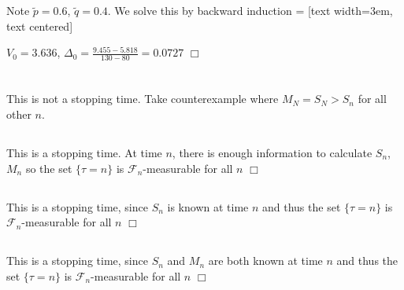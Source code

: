 \documentclass{article}
\begin{document}
\section{}
Note $\tilde{p} = 0.6$, $\tilde{q} = 0.4$. We solve this by backward induction
 = [text width=3em, text centered]
\begin{center}
\end{center}
$V_0 = 3.636$, $\Delta_0 = \frac{9.455 - 5.818}{130 - 80} = 0.0727$ $\Box$

\section{}
\subsection{}
This is not a stopping time. Take counterexample where $M_N = S_N > S_n$ for all other $n$.

\subsection{}
This is a stopping time. At time $n$, there is enough information to calculate $S_n$, $M_n$ so the set $\{\tau = n\}$ is $\mathcal{F}_n$-measurable for all $n$ $\Box$

\subsection{}
This is a stopping time, since $S_n$ is known at time $n$ and thus the set $\{\tau = n\}$ is $\mathcal{F}_n$-measurable for all $n$ $\Box$

\subsection{}
This is a stopping time, since $S_n$ and $M_n$ are both known at time $n$ and thus the set $\{\tau = n\}$ is $\mathcal{F}_n$-measurable for all $n$ $\Box$
\end{document}
